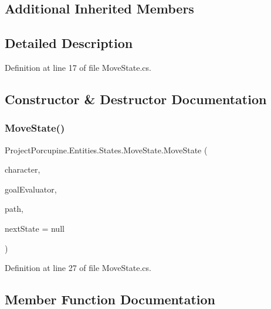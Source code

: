 \subsection*{Additional Inherited Members}


\subsection{Detailed Description}


Definition at line 17 of file Move\+State.\+cs.



\subsection{Constructor \& Destructor Documentation}
\mbox{\label{class_project_porcupine_1_1_entities_1_1_states_1_1_move_state_aeb21b229e65cb74478adb2dd3fe38ec1}} 
\subsubsection{\texorpdfstring{Move\+State()}{MoveState()}}
{\footnotesize\ttfamily Project\+Porcupine.\+Entities.\+States.\+Move\+State.\+Move\+State (\begin{DoxyParamCaption}\item[{\hyperlink{class_project_porcupine_1_1_entities_1_1_character}{Character}}]{character,  }\item[{Pathfinder.\+Goal\+Evaluator}]{goal\+Evaluator,  }\item[{List$<$ \hyperlink{class_tile}{Tile} $>$}]{path,  }\item[{\hyperlink{class_project_porcupine_1_1_entities_1_1_states_1_1_state}{State}}]{next\+State = {\ttfamily null} }\end{DoxyParamCaption})}



Definition at line 27 of file Move\+State.\+cs.



\subsection{Member Function Documentation}
\mbox{\label{class_project_porcupine_1_1_entities_1_1_states_1_1_move_state_ae2cbe17dbccd0db23e01f7734a0f7b8f}} 
